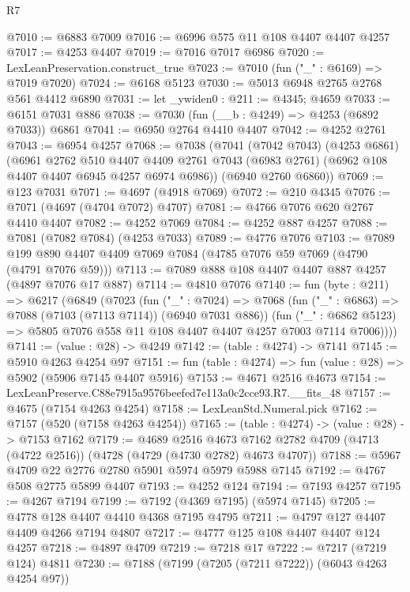 \begin{lexlean}{R7}
\begin{coremodule}
@7010 := @6883 @7009
@7016 := @6996 @575 @11 @108 @4407 @4407 @4257
@7017 := @4253 @4407
@7019 := @7016 @7017 @6986
@7020 := LexLeanPreservation.construct_true
@7023 := @7010 (fun ("_" : @6169) => @7019 @7020)
@7024 := @6168 @5123
@7030 := @5013 @6948 @2765 @2768 @561 @4412 @6890
@7031 := let _ywiden0 : @211 := @4345; @4659
@7033 := @6151 @7031 @886
@7038 := @7030 (fun (__b : @4249) => @4253 (@6892 @7033)) @6861
@7041 := @6950 @2764 @4410 @4407
@7042 := @4252 @2761
@7043 := @6954 @4257
@7068 := @7038
    (@7041
      (@7042 @7043)
      (@4253 @6861)
      (@6961
        @2762
        @510
        @4407
        @4409
        @2761
        @7043
        (@6983 @2761)
        (@6962 @108 @4407 @4407 @6945 @4257 @6974 @6986))
      (@6940 @2760 @6860))
@7069 := @123 @7031
@7071 := @4697 (@4918 @7069)
@7072 := @210 @4345
@7076 := @7071 (@4697 (@4704 @7072) @4707)
@7081 := @4766 @7076 @620 @2767 @4410 @4407
@7082 := @4252 @7069
@7084 := @4252 @887 @4257
@7088 := @7081 (@7082 @7084) (@4253 @7033)
@7089 := @4776 @7076
@7103 := @7089 @199 @890 @4407 @4409 @7069 @7084 (@4785 @7076 @59 @7069 (@4790 (@4791 @7076 @59)))
@7113 := @7089 @888 @108 @4407 @4407 @887 @4257 (@4897 @7076 @17 @887)
@7114 := @4810 @7076
@7140 := fun (byte : @211) =>
  @6217
    (@6849
      (@7023
        (fun ("_" : @7024) =>
        @7068
          (fun ("_" : @6863) => @7088 (@7103 (@7113 @7114)) (@6940 @7031 @886))
          (fun ("_" : @6862 @5123) =>
          @5805 @7076 @558 @11 @108 @4407 @4407 @4257 @7003 @7114 @7006))))
@7141 := (value : @28) -> @4249
@7142 := (table : @4274) -> @7141
@7145 := @5910 @4263 @4254 @97
@7151 := fun (table : @4274) => fun (value : @28) => @5902 (@5906 @7145 @4407 @5916)
@7153 := @4671 @2516 @4673
@7154 := LexLeanPreserve.C88e7915a9576beefed7e113a0c2cce93.R7.__fits_48
@7157 := @4675 (@7154 @4263 @4254)
@7158 := LexLeanStd.Numeral.pick
@7162 := @7157 (@520 (@7158 @4263 @4254))
@7165 := (table : @4274) -> (value : @28) -> @7153 @7162
@7179 := @4689
    @2516
    @4673
    @7162
    @2782
    @4709
    (@4713 (@4722 @2516))
    (@4728 (@4729 (@4730 @2782) @4673 @4707))
@7188 := @5967 @4709 @22 @2776 @2780 @5901 @5974 @5979 @5988 @7145
@7192 := @4767 @508 @2775 @5899 @4407
@7193 := @4252 @124
@7194 := @7193 @4257
@7195 := @4267 @7194
@7199 := @7192 (@4369 @7195) (@5974 @7145)
@7205 := @4778 @128 @4407 @4410 @4368 @7195 @4795
@7211 := @4797 @127 @4407 @4409 @4266 @7194 @4807
@7217 := @4777 @125 @108 @4407 @4407 @124 @4257
@7218 := @4897 @4709
@7219 := @7218 @17
@7222 := @7217 (@7219 @124) @4811
@7230 := @7188 (@7199 (@7205 (@7211 @7222)) (@6043 @4263 @4254 @97))

\end{coremodule}
\end{lexlean}
